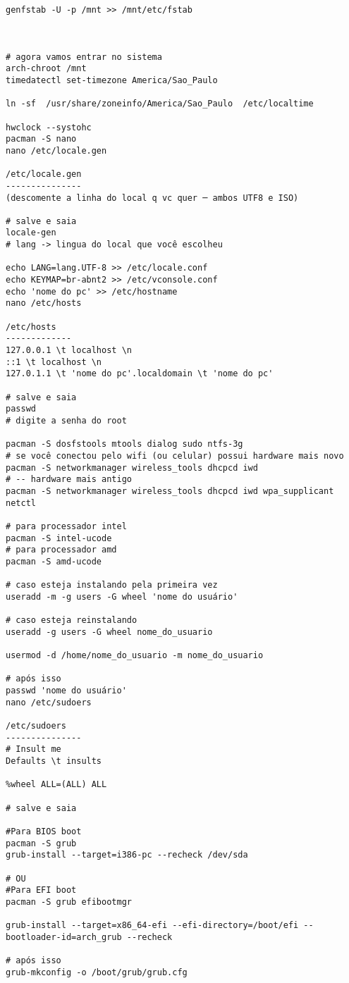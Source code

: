 \documentclass[dark, index]{Iart}
\begin{document}
\begin{lstlisting}
genfstab -U -p /mnt >> /mnt/etc/fstab



# agora vamos entrar no sistema
arch-chroot /mnt
timedatectl set-timezone America/Sao_Paulo

ln -sf  /usr/share/zoneinfo/America/Sao_Paulo  /etc/localtime

hwclock --systohc
pacman -S nano
nano /etc/locale.gen

/etc/locale.gen
---------------
(descomente a linha do local q vc quer ─ ambos UTF8 e ISO)

# salve e saia
locale-gen
# lang -> lingua do local que você escolheu

echo LANG=lang.UTF-8 >> /etc/locale.conf
echo KEYMAP=br-abnt2 >> /etc/vconsole.conf
echo 'nome do pc' >> /etc/hostname
nano /etc/hosts

/etc/hosts
-------------
127.0.0.1 \t localhost \n
::1 \t localhost \n
127.0.1.1 \t 'nome do pc'.localdomain \t 'nome do pc'

# salve e saia
passwd
# digite a senha do root

pacman -S dosfstools mtools dialog sudo ntfs-3g
# se você conectou pelo wifi (ou celular) possui hardware mais novo
pacman -S networkmanager wireless_tools dhcpcd iwd
# -- hardware mais antigo
pacman -S networkmanager wireless_tools dhcpcd iwd wpa_supplicant netctl

# para processador intel
pacman -S intel-ucode
# para processador amd
pacman -S amd-ucode

# caso esteja instalando pela primeira vez
useradd -m -g users -G wheel 'nome do usuário'

# caso esteja reinstalando
useradd -g users -G wheel nome_do_usuario

usermod -d /home/nome_do_usuario -m nome_do_usuario

# após isso
passwd 'nome do usuário'
nano /etc/sudoers

/etc/sudoers
---------------
# Insult me
Defaults \t insults

%wheel ALL=(ALL) ALL

# salve e saia

#Para BIOS boot
pacman -S grub
grub-install --target=i386-pc --recheck /dev/sda

# OU
#Para EFI boot
pacman -S grub efibootmgr

grub-install --target=x86_64-efi --efi-directory=/boot/efi --bootloader-id=arch_grub --recheck

# após isso
grub-mkconfig -o /boot/grub/grub.cfg


\end{lstlisting}
\end{document}
